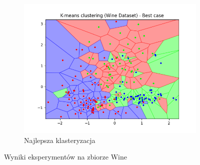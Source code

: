 \documentclass[12pt]{article}
\begin{document}
\begin{figure}[H]
\begin{subfigure}[t]{0.19\textwidth}
        \includegraphics[width=\linewidth]{img/other_datasets/wine_kmeans_best.png}
        \caption{Najlepsza klasteryzacja}
    \end{subfigure}
    \caption{Wyniki eksperymentów na zbiorze Wine}
\end{figure}
\end{document}
